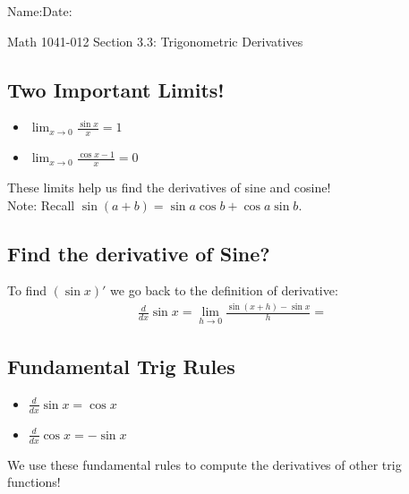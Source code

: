 \documentclass[12pt]{book}
\theoremstyle{definition}
\begin{document}
\begin{flushleft}
Name:\underline{\hspace{13cm}}Date:\underline{\hspace{2cm}}
\end{flushleft}
\begin{center}
{\Large Math 1041-012 \hspace{0.5cm} Section 3.3: Trigonometric Derivatives}
\end{center}
\begin{tcolorbox}
\subsection*{Two Important Limits!}
\begin{itemize}
    \item $\displaystyle\lim_{x\rightarrow 0}\frac{\sin x}{x}=1$
    \item $\displaystyle \lim_{x\rightarrow 0}\frac{\cos x - 1}{x}=0$
\end{itemize}
These limits help us find the derivatives of sine and cosine!\\
Note: Recall $\sin(a+b)=\sin a \cos b+\cos a\sin b$.
\end{tcolorbox}
\subsection*{Find the derivative of Sine?}
To find $(\sin x)'$ we go back to the definition of derivative:
\begin{align*}
    \frac{d}{dx}\sin x = \lim_{h\rightarrow 0}\frac{\sin(x+h)-\sin x}{h}=
\end{align*}
\vspace{6cm}
\begin{tcolorbox}
\subsection*{Fundamental Trig Rules}
\begin{itemize}
    \item $\displaystyle\frac{d}{dx}\sin x=\cos x$
    \item $\displaystyle\frac{d}{dx}\cos x=-\sin x$
\end{itemize}
We use these fundamental rules to compute the derivatives of other trig functions!
\end{tcolorbox}
\raggedbottom
\clearpage
\end{document}
